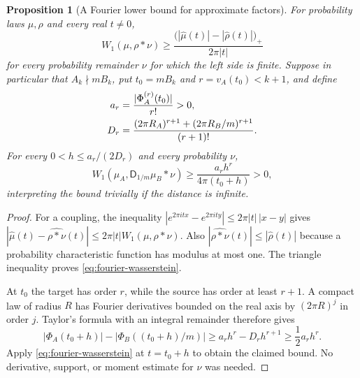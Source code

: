 \documentclass[11pt,a4paper]{article}
\newtheorem{proposition}[theorem]{Proposition}
\theoremstyle{definition}
\theoremstyle{remark}
\newcommand{\D}{\mathsf D}
\begin{document}
\begin{proposition}[A Fourier lower bound for approximate factors]
\label{prop:wasserstein}
For probability laws $\mu,\rho$ and every real $t\ne0$,
\begin{equation}\label{eq:fourier-wasserstein}
 W_1(\mu,\rho*\nu)\ge
 \frac{\bigl(|\widehat\mu(t)|-|\widehat\rho(t)|\bigr)_+}{2\pi|t|}
\end{equation}
for every probability remainder $\nu$ for which the left side is finite.
Suppose in particular that $A_k\nmid mB_k$, put $t_0=mB_k$ and
$r=v_A(t_0)<k+1$, and define
\begin{align}
 a_r&=\frac{|\Phi_A^{(r)}(t_0)|}{r!}>0,\notag\\
 D_r&=\frac{(2\pi R_A)^{r+1}+(2\pi R_B/m)^{r+1}}{(r+1)!}.
 \label{eq:quantitative-constants}
\end{align}
For every $0<h\le a_r/(2D_r)$ and every probability $\nu$,
\begin{equation}\label{eq:quantitative-obstruction}
 W_1(\mu_A,\D_{1/m}\mu_B*\nu)
 \ge\frac{a_r h^r}{4\pi(t_0+h)}>0,
\end{equation}
interpreting the bound trivially if the distance is infinite.
\end{proposition}
\begin{proof}
For a coupling, the inequality
$|e^{2\pi itx}-e^{2\pi ity}|\le2\pi|t|\,|x-y|$
gives
$|\widehat\mu(t)-\widehat{\rho*\nu}(t)|\le2\pi|t|W_1(\mu,\rho*\nu)$.
Also $|\widehat{\rho*\nu}(t)|\le|\widehat\rho(t)|$ because a probability
characteristic function has modulus at most one. The triangle inequality
proves \eqref{eq:fourier-wasserstein}.

At $t_0$ the target has order $r$, while the source has order at least
$r+1$. A compact law of radius $R$ has Fourier derivatives bounded on the
real axis by $(2\pi R)^j$ in order $j$. Taylor's formula with an integral
remainder therefore gives
\[
 |\Phi_A(t_0+h)|-|\Phi_B((t_0+h)/m)|
 \ge a_rh^r-D_rh^{r+1}\ge\frac12a_rh^r.
\]
Apply \eqref{eq:fourier-wasserstein} at $t=t_0+h$ to obtain the claimed
bound. No derivative, support, or moment estimate for $\nu$ was needed.
\end{proof}
\end{document}
